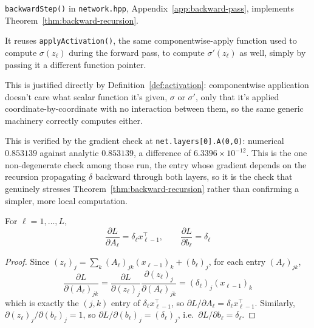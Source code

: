 		\begin{compremark}
			\texttt{backwardStep()} in \texttt{network.hpp}, Appendix~\ref{app:backward-pass}, implements Theorem~\ref{thm:backward-recursion}.
			
			It reuses \texttt{applyActivation()}, the same componentwise-apply function used to compute $\sigma(z_\ell)$ during the forward pass, to compute $\sigma'(z_\ell)$ as well, simply by passing it a different function pointer. 
			
			This is justified directly by Definition~\ref{def:activation}: componentwise application doesn't care what scalar function it's given, $\sigma$ or $\sigma'$, only that it's applied coordinate-by-coordinate with no interaction between them, so the same generic machinery correctly computes either.
			
			This is verified by the gradient check at \texttt{net.layers[0].A(0,0)}: numerical $0.853139$ against analytic $0.853139$, a difference of $6.3396\times10^{-12}$. This is the one non-degenerate check among those run, the entry whose gradient depends on the recursion propagating $\delta$ backward through both layers, so it is the check that genuinely stresses Theorem~\ref{thm:backward-recursion} rather than confirming a simpler, more local computation.
		\end{compremark}
		
		\begin{proposition}
			\label{prop:parameter-gradients}
			For $\ell=1,\dots,L$,
			\[
				\frac{\partial L}{\partial A_\ell} = \delta_\ell x_{\ell-1}^\top, \qquad \frac{\partial L}{\partial b_\ell} = \delta_\ell
			\]
		\end{proposition}
		
		\begin{proof}
			Since $(z_\ell)_j = \sum_k(A_\ell)_{jk}(x_{\ell-1})_k + (b_\ell)_j$, for each entry $(A_\ell)_{jk}$,
			\[
				\frac{\partial L}{\partial(A_\ell)_{jk}} = \frac{\partial L}{\partial(z_\ell)_j} \frac{\partial(z_\ell)_j}{\partial(A_\ell)_{jk}} = (\delta_\ell)_j(x_{\ell-1})_k
			\]
			which is exactly the $(j,k)$ entry of $\delta_\ell x_{\ell-1}^\top$, so $\partial L/\partial A_\ell = \delta_\ell x_{\ell-1}^\top$. Similarly, $\partial(z_\ell)_j/\partial(b_\ell)_j=1$, so $\partial L/\partial(b_\ell)_j=(\delta_\ell)_j$, i.e.\ $\partial L/\partial b_\ell=\delta_\ell$.
		\end{proof}
		
